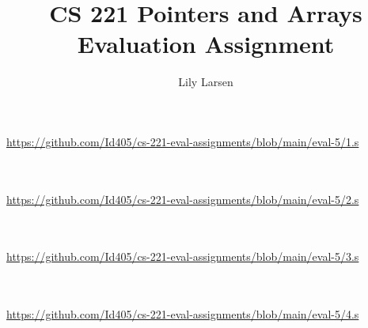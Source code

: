 \documentclass{article}
\title{CS 221 Pointers and Arrays Evaluation Assignment}
\author{Lily Larsen}
\newcommand{\nicecode}[2]{\inputminted[linenos=true,breaklines,fontsize=\small]{#1}{#2}}
\begin{document}
\maketitle
\newpage

\section{}
\vspace{2ex} \par
\url{https://github.com/Id405/cs-221-eval-assignments/blob/main/eval-5/1.s}
\nicecode{asm}{1.s}

\section{}
\vspace{2ex} \par
\url{https://github.com/Id405/cs-221-eval-assignments/blob/main/eval-5/2.s}
\nicecode{asm}{2.s}

\section{}
\vspace{2ex} \par
\url{https://github.com/Id405/cs-221-eval-assignments/blob/main/eval-5/3.s}
\nicecode{asm}{3.s}

\section{}
\vspace{2ex} \par
\url{https://github.com/Id405/cs-221-eval-assignments/blob/main/eval-5/4.s}
\nicecode{asm}{4.s}

\newpage
\end{document}
